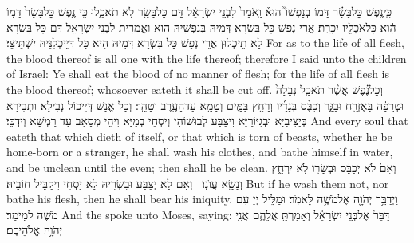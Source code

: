 {כִּֽי\maqqaf נֶ֣פֶשׁ כׇּל\maqqaf בָּשָׂ֗ר דָּמ֣וֹ בְנַפְשׁוֹ֮ הוּא֒ וָֽאֹמַר֙ לִבְנֵ֣י יִשְׂרָאֵ֔ל דַּ֥ם כׇּל\maqqaf בָּשָׂ֖ר לֹ֣א תֹאכֵ֑לוּ כִּ֣י נֶ֤פֶשׁ כׇּל\maqqaf בָּשָׂר֙ דָּמ֣וֹ הִ֔וא כׇּל\maqqaf אֹכְלָ֖יו יִכָּרֵֽת׃}
{אֲרֵי נְפַשׁ כָּל בִּשְׂרָא דְּמֵיהּ בְּנַפְשֵׁיהּ הוּא וַאֲמַרִית לִבְנֵי יִשְׂרָאֵל דַּם כָּל בִּשְׂרָא לָא תֵיכְלוּן אֲרֵי נְפַשׁ כָּל בִּשְׂרָא דְּמֵיהּ הִיא כָּל דְּיֵיכְלִנֵּיהּ יִשְׁתֵּיצֵי׃}
{For as to the life of all flesh, the blood thereof is all one with the life thereof; therefore I said unto the children of Israel: Ye shall eat the blood of no manner of flesh; for the life of all flesh is the blood thereof; whosoever eateth it shall be cut off.}{}
{וְכׇל\maqqaf נֶ֗פֶשׁ אֲשֶׁ֨ר תֹּאכַ֤ל נְבֵלָה֙ וּטְרֵפָ֔ה בָּאֶזְרָ֖ח וּבַגֵּ֑ר וְכִבֶּ֨ס בְּגָדָ֜יו וְרָחַ֥ץ בַּמַּ֛יִם וְטָמֵ֥א עַד\maqqaf הָעֶ֖רֶב וְטָהֵֽר׃}
{וְכָל אֱנָשׁ דְּיֵיכוֹל נְבִילָא וּתְבִירָא בְּיַצִּיבַיָּא וּבְגִיּוֹרַיָּא וִיצַבַּע לְבוּשׁוֹהִי וְיִסְחֵי בְמַיָּא וִיהֵי מְסָאַב עַד רַמְשָׁא וְיִדְכֵּי׃}
{And every soul that eateth that which dieth of itself, or that which is torn of beasts, whether he be home-born or a stranger, he shall wash his clothes, and bathe himself in water, and be unclean until the even; then shall he be clean.}{}
{וְאִם֙ לֹ֣א יְכַבֵּ֔ס וּבְשָׂר֖וֹ לֹ֣א יִרְחָ֑ץ וְנָשָׂ֖א עֲוֺנֽוֹ׃ \petucha }
{וְאִם לָא יְצַבַּע וּבִשְׂרֵיהּ לָא יַסְחֵי וִיקַבֵּיל חוֹבֵיהּ׃}
{But if he wash them not, nor bathe his flesh, then he shall bear his iniquity.}{}
\newperek
{}
{וַיְדַבֵּ֥ר יְהֹוָ֖ה אֶל\maqqaf מֹשֶׁ֥ה לֵּאמֹֽר׃}
{וּמַלֵּיל יְיָ עִם מֹשֶׁה לְמֵימַר׃}
{And the \lord\space spoke unto Moses, saying:}{}
{דַּבֵּר֙ אֶל\maqqaf בְּנֵ֣י יִשְׂרָאֵ֔ל וְאָמַרְתָּ֖ אֲלֵהֶ֑ם אֲנִ֖י יְהֹוָ֥ה אֱלֹהֵיכֶֽם׃}

